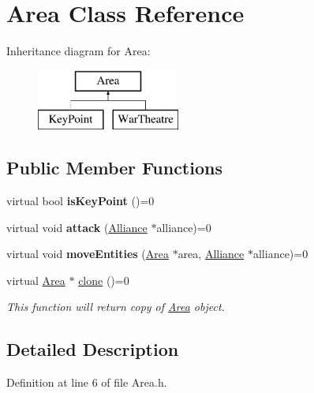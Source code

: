 \hypertarget{classArea}{}\section{Area Class Reference}
\label{classArea}
Inheritance diagram for Area\+:\begin{figure}[H]
\begin{center}
\leavevmode
\includegraphics[height=2.000000cm]{classArea}
\end{center}
\end{figure}
\subsection*{Public Member Functions}
\begin{DoxyCompactItemize}
\item 
\mbox{\label{classArea_a5572fd57878be1d0d1f243de4be742db}} 
virtual bool {\bfseries is\+Key\+Point} ()=0
\item 
\mbox{\label{classArea_a1716b2f2d07575b44f0ad858f615e417}} 
virtual void {\bfseries attack} (\hyperlink{classAlliance}{Alliance} $\ast$alliance)=0
\item 
\mbox{\label{classArea_af51429707bbcbf7ec9349626eef87bd6}} 
virtual void {\bfseries move\+Entities} (\hyperlink{classArea}{Area} $\ast$area, \hyperlink{classAlliance}{Alliance} $\ast$alliance)=0
\item 
virtual \hyperlink{classArea}{Area} $\ast$ \hyperlink{classArea_a383d61c76b8fac66ef903036d776a3a4}{clone} ()=0
\begin{DoxyCompactList}\small\item\em This function will return copy of \hyperlink{classArea}{Area} object. \end{DoxyCompactList}\end{DoxyCompactItemize}


\subsection{Detailed Description}


Definition at line 6 of file Area.\+h.




